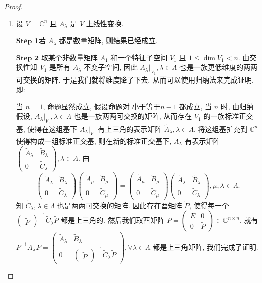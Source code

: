 \documentclass[../../main.tex]{subfiles}%
\begin{document}
\begin{proof}
\begin{enumerate}
\item 设 $V = \mathbb{C}^n$ 且 $A_{\lambda}$ 是 $V$ 上线性变换.

$\mathbf{Step}\,\,\mathbf{1}$若 $A_{\lambda}$ 都是数量矩阵, 则结果已经成立.

$\mathbf{Step}\,\,\mathbf{2}$ 取某个非数量矩阵 $A_1$ 和一个特征子空间 $V_1$ 且 $1 \leqslant  \dim V_1 < n$. 由交换性知 $V_1$ 是所有 $A_{\lambda}$ 不变子空间, 因此 $A_{\lambda}|_{V_1}, \lambda \in \Lambda$ 也是一族更低维度的两两可交换的矩阵. 于是我们就将维度降了下去, 从而可以使用归纳法来完成证明. 即:

当 $n = 1$, 命题显然成立, 假设命题对 小于等于$n - 1$ 都成立, 当 $n$ 时, 由归纳假设, $A_{\lambda}|_{V_1}, \lambda \in \Lambda$ 也是一族两两可交换的矩阵, 从而存在 $V_1$ 的一族标准正交基, 使得在这组基下 $A_{\lambda}|_{V_1}$ 有上三角的表示矩阵 $\widetilde{A}_{\lambda}, \lambda \in \Lambda$. 将这组基扩充到 $\mathbb{C}^n$ 使得构成一组标准正交基, 则在新的标准正交基下, $A_{\lambda}$ 有表示矩阵 $\begin{pmatrix} \widetilde{A}_{\lambda} & \widetilde{B}_{\lambda} \\ 0 & \widetilde{C}_{\lambda} \end{pmatrix}, \lambda \in \Lambda$. 由
\[
\begin{pmatrix} \widetilde{A}_{\lambda} & \widetilde{B}_{\lambda} \\ 0 & \widetilde{C}_{\lambda} \end{pmatrix} \begin{pmatrix} \widetilde{A}_{\mu} & \widetilde{B}_{\mu} \\ 0 & \widetilde{C}_{\mu} \end{pmatrix} = \begin{pmatrix} \widetilde{A}_{\mu} & \widetilde{B}_{\mu} \\ 0 & \widetilde{C}_{\mu} \end{pmatrix} \begin{pmatrix} \widetilde{A}_{\lambda} & \widetilde{B}_{\lambda} \\ 0 & \widetilde{C}_{\lambda} \end{pmatrix},\mu,\lambda \in \Lambda.
\]
知 $\widetilde{C}_{\lambda}, \lambda \in \Lambda$ 也是两两可交换的矩阵. 因此存在酉矩阵 $\widetilde{P}$, 使得每一个 $\begin{pmatrix} \widetilde{P} \end{pmatrix}^{-1} \widetilde{C}_{\lambda} \widetilde{P}$ 都是上三角的. 然后我们取酉矩阵 $P = \begin{pmatrix} E & 0 \\ 0 & \widetilde{P} \end{pmatrix} \in \mathbb{C}^{n \times n}$, 就有 $P^{-1}A_{\lambda}P = \begin{pmatrix} \widetilde{A}_{\lambda} & \widetilde{B}_{\lambda} \\ 0 & \begin{pmatrix} \widetilde{P} \end{pmatrix}^{-1} \widetilde{C}_{\lambda} \widetilde{P} \end{pmatrix}, \forall \lambda \in \Lambda$ 都是上三角矩阵, 我们完成了证明.


\end{enumerate}
\end{proof}
\end{document}

